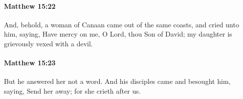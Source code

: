 		\paragraph{Matthew 15:22} %
			\label{MATTHEW-15-22}

			And, behold, a woman of Canaan came out of the same coasts, and cried unto him, saying, Have mercy on me, O Lord, thou Son of David; my daughter is grievously vexed with a devil.

			\begin{framed}
			\scriptsize
				\begin{compactdesc}
					\item[SBLG] 
				\end{compactdesc}
			\end{framed}

		\paragraph{Matthew 15:23} %
			\label{MATTHEW-15-23}

			But he answered her not a word. And his disciples came and besought him, saying, Send her away; for she crieth after us.

